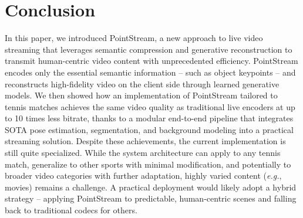 \documentclass[manuscript, screen]{acmart}
\newcommand{\eg}{\emph{e.g.}, }
\begin{document}














\section{Conclusion}
In this paper, we introduced PointStream, a new approach to live video streaming that leverages semantic compression and generative reconstruction to transmit human-centric video content with unprecedented efficiency. PointStream encodes only the essential semantic information -- such as object keypoints -- and reconstructs high-fidelity video on the client side through learned generative models.
We then showed how an implementation of PointStream tailored to tennis matches achieves the same video quality as traditional live encoders at up to \num{10} times less bitrate, thanks to a modular end-to-end pipeline that integrates SOTA pose estimation, segmentation, and background modeling into a practical streaming solution.
Despite these achievements, the current implementation is still quite specialized. While the system architecture can apply to any tennis match, generalize to other sports with minimal modification, and potentially to broader video categories with further adaptation, highly varied content (\eg movies) remains a challenge. A practical deployment would likely adopt a hybrid strategy -- applying PointStream to predictable, human-centric scenes and falling back to traditional codecs for others.
\end{document}
